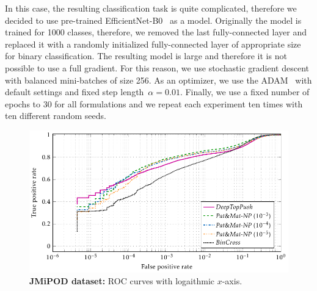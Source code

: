 In this case, the resulting classification task is quite complicated, therefore we decided to use pre-trained EfficientNet-B0~\cite{tan2019efficientnet} as a model. Originally the model is trained for 1000 classes, therefore, we removed the last fully-connected layer and replaced it with a randomly initialized fully-connected layer of appropriate size for binary classification. The resulting model is large and therefore it is not possible to use a full gradient. For this reason, we use stochastic gradient descent with balanced mini-batches of size 256. As an optimizer, we use the ADAM~\cite{kingma2014adam} with default settings and fixed step length~$\alpha = 0.01.$ Finally, we use a fixed number of epochs to 30 for all formulations and we repeat each experiment ten times with ten different random seeds.

\begin{figure}[!t]
  \centering
  \includegraphics{images/stego_jmipod.pdf}
  \caption{\textbf{JMiPOD dataset:} ROC curves with logaithmic $x$-axis.}
  \label{fig: steganalysis jmipod}
\end{figure}

